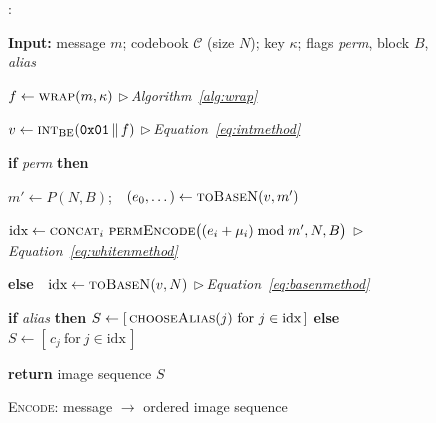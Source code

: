 \documentclass[10pt,a4paper]{article}
\theoremstyle{definition}
\newcounter{algln}
\begin{document}
\begin{figure}[t]\captionsetup{type=algorithm}
\caption{\textsc{Encode}: message $\to$ ordered image sequence}\label{alg:encode}
\begin{list}{\footnotesize{}:}{%
    \setlength{\leftmargin}{2.4em}\setlength{\labelwidth}{1.7em}%
    \setlength{\labelsep}{0.4em}\setlength{\itemsep}{1.5pt}%
    \setlength{\parsep}{0pt}\setlength{\topsep}{3pt}\small}
\item \textbf{Input:} message $m$; codebook $\mathcal{C}$ (size $N$); key $\kappa$;
      flags \textit{perm}, block $B$, \textit{alias}
\item $f\gets\textsc{wrap}(m,\kappa)$ \hfill{\footnotesize$\triangleright$\,\textit{Algorithm~\ref{alg:wrap}}}
\item $v\gets\textsc{int}_{\mathrm{BE}}(\mathtt{0x01}\,\Vert\, f)$ \hfill{\footnotesize$\triangleright$\,\textit{Equation~\eqref{eq:intmethod}}}
\item \textbf{if} \textit{perm} \textbf{then}
\item \hspace*{1.3em} $m'\gets P(N,B)$;\ \ $(e_0,\dots)\gets\textsc{toBaseN}(v,m')$
\item \hspace*{1.3em} $\text{idx}\gets\textsc{concat}_i\ \textsc{permEncode}\big((e_i+\mu_i)\bmod m',N,B\big)$ \hfill{\footnotesize$\triangleright$\,\textit{Equation~\eqref{eq:whitenmethod}}}
\item \textbf{else}\ \ $\text{idx}\gets\textsc{toBaseN}(v,N)$ \hfill{\footnotesize$\triangleright$\,\textit{Equation~\eqref{eq:basenmethod}}}
\item \textbf{if} \textit{alias} \textbf{then} $S\gets[\,\textsc{chooseAlias}(j)\ \text{for}\ j\in\text{idx}\,]$
      \textbf{else} $S\gets[\,c_j\ \text{for}\ j\in\text{idx}\,]$
\item \textbf{return} image sequence $S$
\end{list}
\end{figure}
\end{document}
